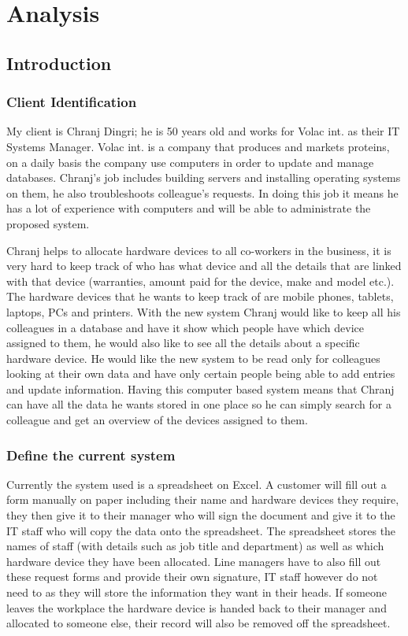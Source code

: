 \chapter{Analysis}

\section{Introduction}

\subsection{Client Identification}

My client is Chranj Dingri; he is 50 years old and works for Volac int. as their IT Systems Manager. Volac int. is a company that produces and markets proteins, on a daily basis the company use computers in order to update and manage databases. Chranj's job includes building servers and installing operating systems on them, he also troubleshoots colleague's requests. In doing this job it means he has a lot of experience with computers and will be able to administrate the proposed system.


Chranj helps to allocate hardware devices to all co-workers in the business, it is very hard to keep track of who has what device and all the details that are linked with that device (warranties, amount paid for the device, make and model etc.). The hardware devices that he wants to keep track of are mobile phones, tablets, laptops, PCs and printers. With the new system Chranj would like to keep all his colleagues in a database and have it show which people have which device assigned to them, he would also like to see all the details about a specific hardware device. He would like the new system to be read only for colleagues looking at their own data and have only certain people being able to add entries and update information. Having this computer based system means that Chranj can have all the data he wants stored in one place so he can simply search for a colleague and get an overview of the devices assigned to them. 

\subsection{Define the current system}

Currently the system used is a spreadsheet on Excel. A customer will fill out a form manually on paper including their name and hardware devices they require, they then give it to their manager who will sign the document and give it to the IT staff who will copy the data onto the spreadsheet.  The spreadsheet stores the names of staff (with details such as job title and department) as well as which hardware device they have been allocated. Line managers have to also fill out these request forms and provide their own signature, IT staff however do not need to as they will store the information they want in their heads. If someone leaves the workplace the hardware device is handed back to their manager and allocated to someone else, their record will also be removed off the spreadsheet. 

